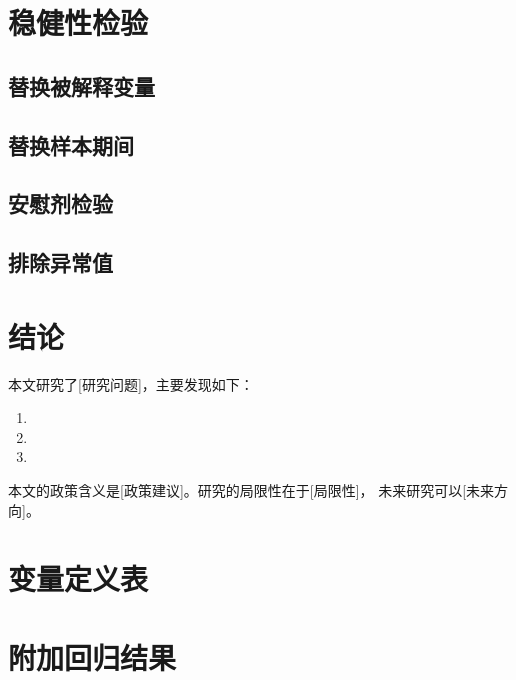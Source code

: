 \documentclass[12pt,a4paper]{article}
\begin{document}
\section{稳健性检验}

\subsection{替换被解释变量}

\subsection{替换样本期间}

\subsection{安慰剂检验}

\subsection{排除异常值}

\section{结论}

本文研究了[研究问题]，主要发现如下：
\begin{enumerate}
  \item [发现一]
  \item [发现二]
  \item [发现三]
\end{enumerate}

本文的政策含义是[政策建议]。研究的局限性在于[局限性]，
未来研究可以[未来方向]。

\printbibliography

\appendix
\section{变量定义表}
\section{附加回归结果}
\end{document}
